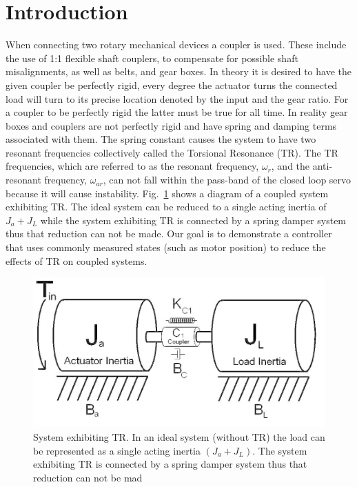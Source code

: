 \section{Introduction}

When connecting two rotary mechanical devices a coupler is used. These include the use of 1:1 flexible shaft couplers, to compensate for possible shaft misalignments, as well as belts, and gear boxes. In theory it is desired to have the given coupler be perfectly rigid, every degree the actuator turns the connected load will turn to its precise location denoted by the input and the gear ratio. For a coupler to be perfectly rigid the latter must be true for all time. In reality gear boxes and couplers are not perfectly rigid and have spring and damping terms associated with them. The spring constant causes the system to have two resonant frequencies collectively called the Torsional Resonance (TR). The TR frequencies, which are referred to as the resonant frequency, $\omega_r$, and the anti-resonant frequency, $\omega_{ar}$, can not fall within the pass-band of the closed loop servo because it will cause instability.  Fig.~\ref{fig:couple} shows a diagram of a coupled system exhibiting TR. The ideal system can be reduced to a single acting inertia of $J_a+J_L$ while the system exhibiting TR is connected by a spring damper system thus that reduction can not be made.  Our goal is to demonstrate a controller that uses commonly measured states (such as motor position) to reduce the effects of TR on coupled systems.

\begin{figure}[t]
  \centering
\includegraphics[width=1.0\columnwidth]{./pix/couple.png}
  \caption{System exhibiting TR. In an ideal
system (without TR) the load can be represented as a single acting inertia $(J_a+J_L)$.  The system exhibiting TR is connected by a
spring damper system thus that reduction can not be mad}
  \label{fig:couple}
\end{figure}

